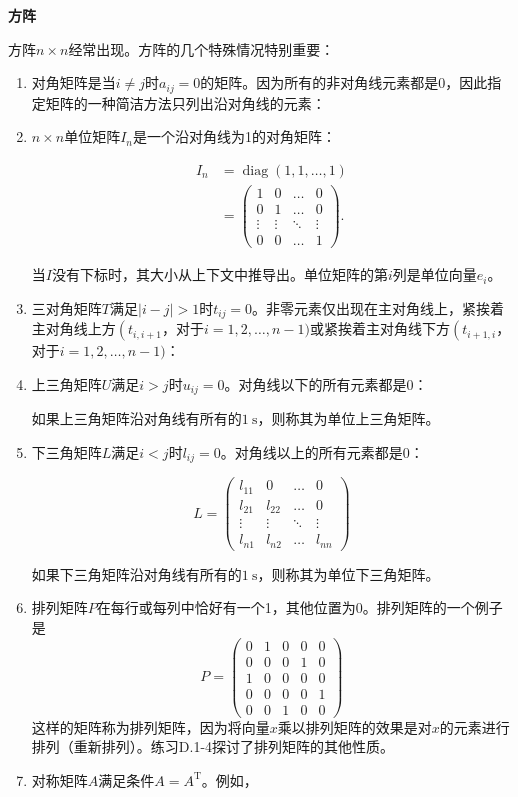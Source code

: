 \documentclass[lang=cn,newtx,10pt,scheme=chinese]{elegantbook}
\begin{document}
\textbf{方阵}

方阵$n \times n$经常出现。方阵的几个特殊情况特别重要：

\begin{enumerate}
\item 对角矩阵是当$i \neq j$时$a_{i j}=0$的矩阵。因为所有的非对角线元素都是0，因此指定矩阵的一种简洁方法只列出沿对角线的元素：
\item $n \times n$单位矩阵$I_n$是一个沿对角线为1的对角矩阵：

$$
\begin{aligned}
I_n & =\operatorname{diag}(1,1, \ldots, 1) \\
& =\left(\begin{array}{cccc}
1 & 0 & \ldots & 0 \\
0 & 1 & \ldots & 0 \\
\vdots & \vdots & \ddots & \vdots \\
0 & 0 & \ldots & 1
\end{array}\right) .
\end{aligned}
$$

当$I$没有下标时，其大小从上下文中推导出。单位矩阵的第$i$列是单位向量$e_i$。
\item 三对角矩阵$T$满足$|i-j|>1$时$t_{i j}=0$。非零元素仅出现在主对角线上，紧挨着主对角线上方$\left(t_{i, i+1}\right.$，对于$i=1,2, \ldots, n-1)$或紧挨着主对角线下方$\left(t_{i+1, i}\right.$，对于$i=1,2, \ldots, n-1)$：
\item 上三角矩阵$U$满足$i>j$时$u_{i j}=0$。对角线以下的所有元素都是0：

如果上三角矩阵沿对角线有所有的$1 \mathrm{~s}$，则称其为单位上三角矩阵。
\item 下三角矩阵$L$满足$i<j$时$l_{i j}=0$。对角线以上的所有元素都是0：

$$
L=\left(\begin{array}{cccc}
l_{11} & 0 & \ldots & 0 \\
l_{21} & l_{22} & \ldots & 0 \\
\vdots & \vdots & \ddots & \vdots \\
l_{n 1} & l_{n 2} & \ldots & l_{n n}
\end{array}\right)
$$

如果下三角矩阵沿对角线有所有的$1 \mathrm{~s}$，则称其为单位下三角矩阵。
\item 排列矩阵$P$在每行或每列中恰好有一个1，其他位置为0。排列矩阵的一个例子是
$$
P=\left(\begin{array}{lllll}
0 & 1 & 0 & 0 & 0 \\
0 & 0 & 0 & 1 & 0 \\
1 & 0 & 0 & 0 & 0 \\
0 & 0 & 0 & 0 & 1 \\
0 & 0 & 1 & 0 & 0
\end{array}\right)
$$
这样的矩阵称为排列矩阵，因为将向量$x$乘以排列矩阵的效果是对$x$的元素进行排列（重新排列）。练习D.1-4探讨了排列矩阵的其他性质。
\item 对称矩阵$A$满足条件$A=A^{\mathrm{T}}$。例如，


\end{enumerate}
\end{document}
